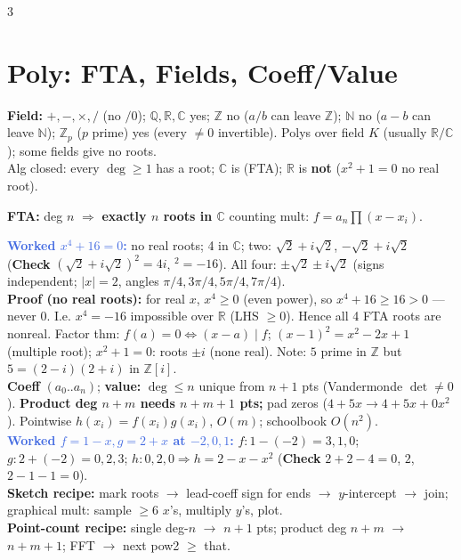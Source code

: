 \documentclass[9pt]{extarticle}
\newcommand{\hl}[1]{\textbf{\textcolor{BrickRed}{#1}}}
\newcommand{\wk}[1]{\textbf{\textcolor{OliveGreen}{#1}}}
\newcommand{\ex}[1]{\textbf{\textcolor{RoyalBlue}{#1}}}
\begin{document}
\begin{multicols}{3}
\section{Poly: FTA, Fields, Coeff/Value}
\begin{sloppypar}\raggedright
\textbf{Field:} $+,-,{\times},/$ (no $/0$); $\mathbb Q,\mathbb R,\mathbb C$ yes; $\mathbb Z$ no ($a/b$ can leave $\mathbb Z$); $\mathbb N$ no ($a{-}b$ can leave $\mathbb N$); $\mathbb Z_p$ ($p$ prime) yes (every ${\ne}0$ invertible). Polys over field $K$ (usually $\mathbb R/\mathbb C$); some fields give no roots.\\
Alg closed: every $\deg{\ge}1$ has a root; $\mathbb C$ is (FTA); $\mathbb R$ is \hl{not} ($x^2{+}1{=}0$ no real root).\\
\end{sloppypar}
\begin{kbox}\raggedright
\textbf{FTA:} deg $n$ $\Rightarrow$ \hl{exactly $n$ roots in $\mathbb C$} counting mult: $f{=}a_n\prod(x{-}x_i)$.
\end{kbox}
\begin{sloppypar}\raggedright
\ex{Worked $x^4{+}16{=}0$:} no real roots; 4 in $\mathbb C$; two: $\sqrt2{+}i\sqrt2$, ${-}\sqrt2{+}i\sqrt2$ (\wk{Check} $(\sqrt2{+}i\sqrt2)^2{=}4i$, $^2{=}{-}16$). All four: $\pm\sqrt2{\pm}i\sqrt2$ (signs independent; $|x|{=}2$, angles $\pi/4,3\pi/4,5\pi/4,7\pi/4$).\\
\wk{Proof (no real roots):} for real $x$, $x^4{\ge}0$ (even power), so $x^4{+}16{\ge}16{>}0$ — never $0$. I.e. $x^4{=}{-}16$ impossible over $\mathbb R$ (LHS ${\ge}0$). Hence all 4 FTA roots are nonreal. Factor thm: $f(a){=}0\iff(x{-}a)\mid f$; $(x{-}1)^2{=}x^2{-}2x{+}1$ (multiple root); $x^2{+}1{=}0$: roots ${\pm}i$ (none real). Note: $5$ prime in $\mathbb Z$ but $5{=}(2{-}i)(2{+}i)$ in $\mathbb Z[i]$.\\
\textbf{Coeff} $(a_0..a_n)$; \hl{value:} $\deg{\le}n$ unique from $n{+}1$ pts (Vandermonde $\det{\ne}0$). \hl{Product deg $n{+}m$ needs $n{+}m{+}1$ pts;} pad zeros ($4{+}5x\to4{+}5x{+}0x^2$). Pointwise $h(x_i){=}f(x_i)g(x_i)$, $O(m)$; schoolbook $O(n^2)$.\\
\ex{Worked $f{=}1{-}x,g{=}2{+}x$ at ${-}2,0,1$:} $f{:}1{-}({-}2){=}3,1,0$; $g{:}2{+}({-}2){=}0,2,3$; $h{:}0,2,0\Rightarrow h{=}2{-}x{-}x^2$ (\wk{Check} $2{+}2{-}4{=}0$, $2$, $2{-}1{-}1{=}0$).\\
\wk{Sketch recipe:} mark roots $\to$ lead-coeff sign for ends $\to$ $y$-intercept $\to$ join; graphical mult: sample ${\ge}6$ $x$'s, multiply $y$'s, plot.\\
\wk{Point-count recipe:} single deg-$n$ $\to$ $n{+}1$ pts; product deg $n{+}m$ $\to$ $n{+}m{+}1$; FFT $\to$ next pow2 ${\ge}$ that.
\end{sloppypar}


\end{multicols}
\end{document}

